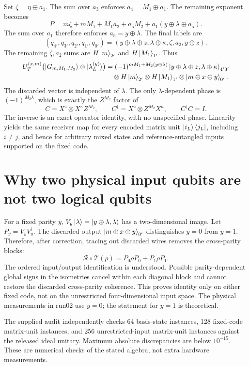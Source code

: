 \documentclass[10pt,a4paper]{article}
\begin{document}
Set $\zeta=\eta\oplus a_1$. The sum over $a_3$ enforces $a_4=M_1\oplus a_1$. The remaining exponent becomes
\begin{equation}
P=m\zeta+mM_1+M_1a_2+a_5M_2+a_1(y\oplus\lambda\oplus a_5).
\end{equation}
The sum over $a_1$ therefore enforces $a_5=y\oplus\lambda$. The final labels are
\begin{equation}
(q_{4'},q_{3'},q_{2'},q_{1'},q_{0'})=
(y\oplus\lambda\oplus z,\lambda\oplus\kappa,\zeta,a_2,y\oplus z).
\end{equation}
The remaining $\zeta,a_2$ sums are $H\ket m_{2'}$ and $H\ket{M_1}_{1'}$. Thus
\begin{align}
 U_T^{(x,m)}\bigl(\ket{G_{m;M_1,M_2}}\otimes\ket{\lambda_L^{(y)}}\bigr)
 &=(-1)^{mM_1+M_2(y\oplus\lambda)}
 \ket{y\oplus\lambda\oplus z,\lambda\oplus\kappa}_{4'3'}\notag\\
 &\quad\otimes H\ket m_{2'}\otimes H\ket{M_1}_{1'}\otimes\ket{m\oplus x\oplus y}_{0'}.
\end{align}
The discarded vector is independent of $\lambda$. The only $\lambda$-dependent phase is $(-1)^{M_2\lambda}$, which is exactly the $Z^{M_2}$ factor of
\begin{equation}
 C=X^z\otimes X^\kappa Z^{M_2},\qquad
 C^\dagger=X^z\otimes Z^{M_2}X^\kappa,\qquad C^\dagger C=I.
\end{equation}
The inverse is an exact operator identity, with no unspecified phase. Linearity yields the same receiver map for every encoded matrix unit $\ket{i_L}\bra{j_L}$, including $i\ne j$, and hence for arbitrary mixed states and reference-entangled inputs supported on the fixed code.

\section{Why two physical input qubits are not two logical qubits}
For a fixed parity $y$, $V_y\ket\lambda=\ket{y\oplus\lambda,\lambda}$ has a two-dimensional image. Let $P_y=V_yV_y^\dagger$. The discarded output $\ket{m\oplus x\oplus y}_{0'}$ distinguishes $y=0$ from $y=1$. Therefore, after correction, tracing out discarded wires removes the cross-parity blocks:
\begin{equation}
\mathcal R\circ\mathcal T(\rho)=P_0\rho P_0+P_1\rho P_1.
\end{equation}
The ordered input/output identification is understood. Possible parity-dependent global signs in the isometries cancel within each diagonal block and cannot restore the discarded cross-parity coherence. This proves identity only on either fixed code, not on the unrestricted four-dimensional input space. The physical measurements in run02 use $y=0$; the statement for $y=1$ is theoretical.

The supplied audit independently checks 64 basis-state instances, 128 fixed-code matrix-unit instances, and 256 unrestricted-input matrix-unit instances against the released ideal unitary. Maximum absolute discrepancies are below $10^{-15}$. These are numerical checks of the stated algebra, not extra hardware measurements.
\end{document}
